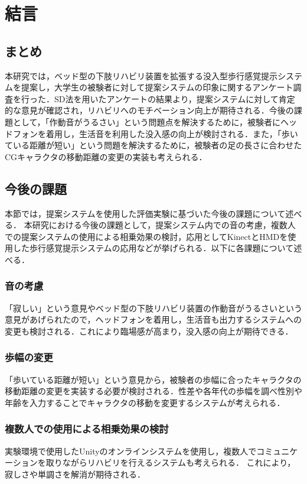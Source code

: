 \chapter{結言}
\thispagestyle{myheadings}

\section{まとめ}
本研究では，ベッド型の下肢リハビリ装置を拡張する没入型歩行感覚提示システムを提案し，大学生の被験者に対して提案システムの印象に関するアンケート調査を行った．SD法を用いたアンケートの結果より，提案システムに対して肯定的な意見が確認され，リハビリへのモチベーション向上が期待される．今後の課題として，「作動音がうるさい」という問題点を解決するために，被験者にヘッドフォンを着用し，生活音を利用した没入感の向上が検討される．また，「歩いている距離が短い」という問題を解決するために，被験者の足の長さに合わせたCGキャラクタの移動距離の変更の実装も考えられる．
\section{今後の課題}
本節では，提案システムを使用した評価実験に基づいた今後の課題について述べる．
本研究における今後の課題として，提案システム内での音の考慮，複数人での提案システムの使用による相乗効果の検討，応用としてKinectとHMDを使用した歩行感覚提示システムの応用などが挙げられる．以下に各課題について述べる．
\subsection{音の考慮}
「寂しい」という意見やベッド型の下肢リハビリ装置の作動音がうるさいという意見があげられたので，ヘッドフォンを着用し，生活音も出力するシステムへの変更も検討される．これにより臨場感が高まり，没入感の向上が期待できる．

\subsection{歩幅の変更}
「歩いている距離が短い」という意見から，被験者の歩幅に合ったキャラクタの移動距離の変更を実装する必要が検討される．性差や各年代の歩幅を調べ性別や年齢を入力することでキャラクタの移動を変更するシステムが考えられる．

\subsection{複数人での使用による相乗効果の検討}
実験環境で使用したUnityのオンラインシステムを使用し，複数人でコミュニケーションを取りながらリハビリを行えるシステムも考えられる．
これにより，寂しさや単調さを解消が期待される．

